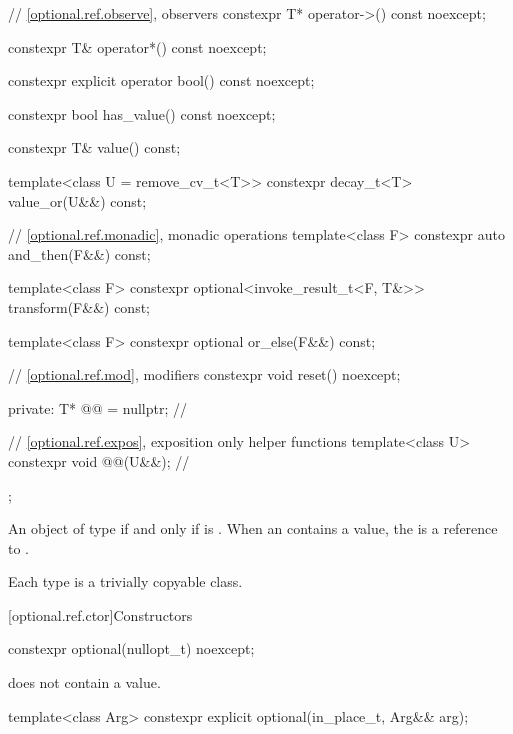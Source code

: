 \begin{codeblock}
{{    // \ref{optional.ref.observe}, observers
    constexpr T* operator->() const noexcept;

    constexpr T& operator*() const noexcept;

    constexpr explicit operator bool() const noexcept;

    constexpr bool has_value() const noexcept;

    constexpr T& value() const;

    template<class U = remove_cv_t<T>> constexpr decay_t<T> value_or(U&&) const;

    // \ref{optional.ref.monadic}, monadic operations
    template<class F> constexpr auto and_then(F&&) const;

    template<class F> constexpr optional<invoke_result_t<F, T&>> transform(F&&) const;

    template<class F> constexpr optional or_else(F&&) const;

    // \ref{optional.ref.mod}, modifiers
    constexpr void reset() noexcept;

  private:
    T* @@ = nullptr; // \expos

    // \ref{optional.ref.expos}, exposition only helper functions
    template<class U> constexpr void @@(U&&); // \expos
  };
}
\end{codeblock}

\pnum
An object of type   if and only if  is . When an  contains a value, the  is a reference to .

\pnum
Each type  is a trivially copyable class.

[optional.ref.ctor]{Constructors}

%
\begin{itemdecl}
constexpr optional(nullopt_t) noexcept;
\end{itemdecl}

\begin{itemdescr}
\pnum
\ensures
{} does not contain a value.
\end{itemdescr}

%
\begin{itemdecl}
template<class Arg>
  constexpr explicit optional(in_place_t, Arg&& arg);
\end{itemdecl}

